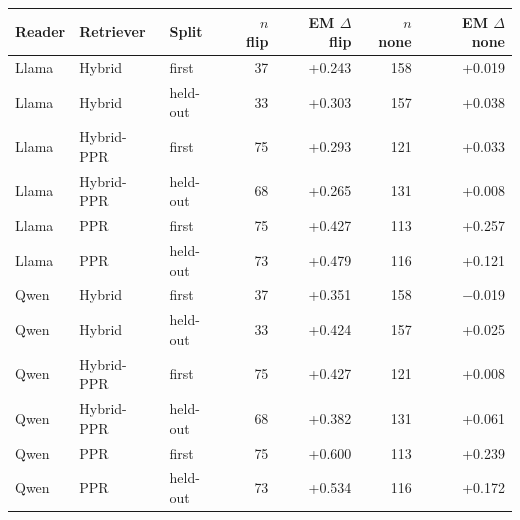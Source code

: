 \begin{tabular}{lllrrrr}
\toprule
Reader & Retriever & Split & $n$ flip & EM $\Delta$ flip & $n$ none & EM $\Delta$ none\\
\midrule
Llama & Hybrid & first & 37 & +0.243 & 158 & +0.019\\
Llama & Hybrid & held-out & 33 & +0.303 & 157 & +0.038\\
Llama & Hybrid-PPR & first & 75 & +0.293 & 121 & +0.033\\
Llama & Hybrid-PPR & held-out & 68 & +0.265 & 131 & +0.008\\
Llama & PPR & first & 75 & +0.427 & 113 & +0.257\\
Llama & PPR & held-out & 73 & +0.479 & 116 & +0.121\\
Qwen & Hybrid & first & 37 & +0.351 & 158 & $-$0.019\\
Qwen & Hybrid & held-out & 33 & +0.424 & 157 & +0.025\\
Qwen & Hybrid-PPR & first & 75 & +0.427 & 121 & +0.008\\
Qwen & Hybrid-PPR & held-out & 68 & +0.382 & 131 & +0.061\\
Qwen & PPR & first & 75 & +0.600 & 113 & +0.239\\
Qwen & PPR & held-out & 73 & +0.534 & 116 & +0.172\\
\bottomrule
\end{tabular}
